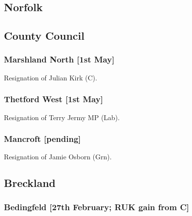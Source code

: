 \documentclass[a4paper,openany]{book}
\begin{document}
\begin{resultsiii}
\section{Norfolk}

\subsection*{County Council}

\subsubsection*{Marshland North \hspace*{\fill}\nolinebreak[1]%
	\enspace\hspace*{\fill}
	[1st May]}


Resignation of Julian Kirk (C).

\subsubsection*{Thetford West \hspace*{\fill}\nolinebreak[1]%
	\enspace\hspace*{\fill}
	[1st May]}


Resignation of Terry Jermy MP (Lab).

\subsubsection*{Mancroft \hspace*{\fill}\nolinebreak[1]%
	\enspace\hspace*{\fill}
	[pending]}


Resignation of Jamie Osborn (Grn).

\subsection*{Breckland}

\subsubsection*{Bedingfeld \hspace*{\fill}\nolinebreak[1]%
	\enspace\hspace*{\fill}
	[27th February; RUK gain from C]}


\end{resultsiii}
\end{document}
